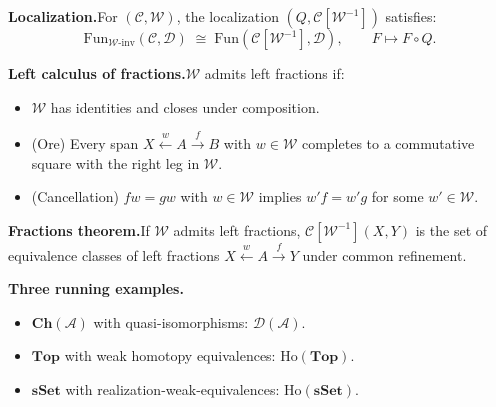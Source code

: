 \begin{formalrestatement}
\textbf{Localization.}\quad For $(\mathcal{C}, \mathcal{W})$, the
localization $(Q, \mathcal{C}[\mathcal{W}^{-1}])$ satisfies:
\begin{equation*}
  \mathrm{Fun}_{\mathcal{W}\text{-inv}}(\mathcal{C}, \mathcal{D}) \;\cong\;
  \mathrm{Fun}(\mathcal{C}[\mathcal{W}^{-1}], \mathcal{D}),
  \qquad F \longmapsto F \circ Q.
\end{equation*}

\medskip
\textbf{Left calculus of fractions.}\quad $\mathcal{W}$ admits left
fractions if:
\begin{itemize}
  \item $\mathcal{W}$ has identities and closes under composition.
  \item (Ore) Every span $X \xleftarrow{w} A \xrightarrow{f} B$ with
        $w \in \mathcal{W}$ completes to a commutative square with the
        right leg in $\mathcal{W}$.
  \item (Cancellation) $fw = gw$ with $w \in \mathcal{W}$ implies
        $w'f = w'g$ for some $w' \in \mathcal{W}$.
\end{itemize}

\medskip
\textbf{Fractions theorem.}\quad If $\mathcal{W}$ admits left fractions,
$\mathcal{C}[\mathcal{W}^{-1}](X, Y)$ is the set of equivalence classes
of left fractions $X \xleftarrow{w} A \xrightarrow{f} Y$ under common
refinement.

\medskip
\textbf{Three running examples.}\quad
\begin{itemize}
  \item $\mathbf{Ch}(\mathcal{A})$ with quasi-isomorphisms: $\mathcal{D}(\mathcal{A})$.
  \item $\mathbf{Top}$ with weak homotopy equivalences: $\mathrm{Ho}(\mathbf{Top})$.
  \item $\mathbf{sSet}$ with realization-weak-equivalences: $\mathrm{Ho}(\mathbf{sSet})$.
\end{itemize}
\end{formalrestatement}
